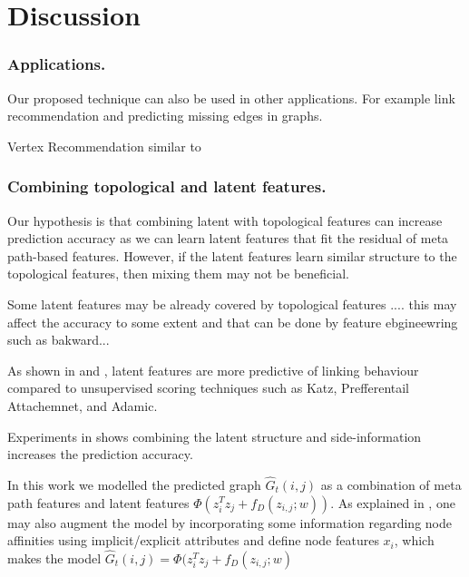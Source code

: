 \section{Discussion}


\subsubsection{Applications.} Our proposed technique can also be used in other applications. For example link recommendation and predicting missing edges in graphs.

Vertex Recommendation similar to \cite{ou2016asymmetric} 


\subsubsection{Combining topological and latent features.}

Our hypothesis is that combining latent with topological features can increase prediction accuracy as we can learn latent features that fit the residual of meta path-based features. However, if the latent features learn similar structure to the topological features, then mixing them may not be beneficial. 

Some latent features may be already covered by topological features .... this may affect the accuracy to some extent and that can be done by feature ebgineewring such as bakward... 

As shown in \cite{menon2011link} and \cite{Zhu2016}, latent features are more predictive of linking behaviour compared to unsupervised scoring techniques such as Katz, Prefferentail Attachemnet, and Adamic.

Experiments in \cite{menon2011link} shows combining the latent structure and side-information increases the prediction accuracy.


In this work we modelled the predicted graph $ \hat{G}_t(i,j)$ as a combination of meta path features and latent features $\Phi(z_{i}^Tz_{j} + f_D(z_{i,j};w))$. As explained in \cite{menon2011link}, one may also augment the model by incorporating some information regarding node affinities using implicit/explicit attributes and define node features $x_i$, which makes the model $\hat{G}_t(i,j) = \Phi(z_{i}^Tz_{j} + f_D(z_{i,j};w)$



